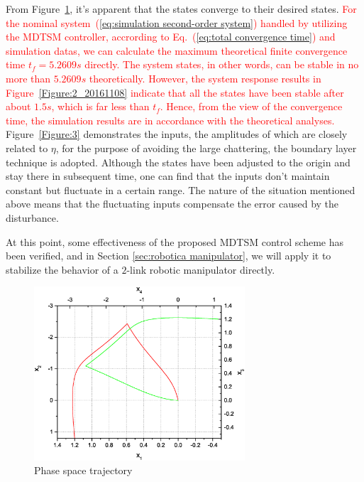 \documentclass[3p]{elsarticle}
\theoremstyle{plain}
\theoremstyle{remark}
\begin{document}
From Figure~\ref{Figure:2}, it's apparent that the states converge to their desired states. \textcolor{red}{For the nominal system~(\ref{eq:simulation second-order system}) handled by utilizing the MDTSM controller, accrording to Eq.~(\ref{eq:total convergence time}) and simulation datas, we can calculate the maximum theoretical finite convergence time $t_f=5.2609s$ directly. The system states, in other words, can be stable in no more than $5.2609s$ theoretically. However, the system response results in Figure~\ref{Figure:2_20161108} indicate that all the states have been stable after about $1.5s$, which is far less than $t_f$. Hence, from the view of the convergence time, the simulation results are in accordance with the theoretical analyses.} Figure~\ref{Figure:3} demonstrates the inputs, the amplitudes of which are closely related to $\eta$, for the purpose of avoiding the large chattering, the boundary layer technique is adopted. Although the states have been adjusted to the origin and stay there in subsequent time, one can find that the inputs don't maintain constant but fluctuate in a certain range. The nature of the situation mentioned above means that the fluctuating inputs compensate the error caused by the disturbance.\par
At this point, some effectiveness of the proposed MDTSM control scheme has been verified, and in Section \ref{sec:robotica manipulator}, we will apply it to stabilize the behavior of a $2$-link robotic manipulator directly.
\begin{figure}
\centering
\includegraphics[width=0.7\textwidth]{paper3_fig2.eps}
\caption{Phase space trajectory}
\label{Figure:2}
\end{figure}
\end{document}
